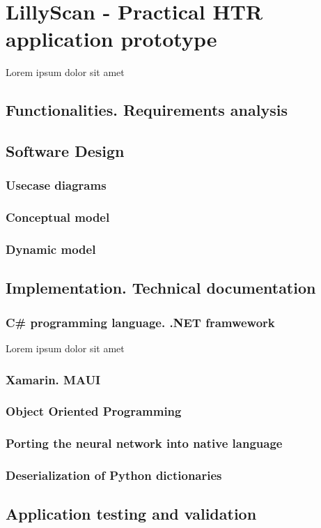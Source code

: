 \chapter{LillyScan - Practical HTR application prototype}
\label{chap:ch4}

\par Lorem ipsum dolor sit amet

\section{Functionalities. Requirements analysis}

\section{Software Design}

\subsection{Usecase diagrams}
\subsection{Conceptual model}
\subsection{Dynamic model}

\section{Implementation. Technical documentation}


\subsection{C\# programming language. .NET framwework}
\label{sec:ch3sec1}

\par Lorem ipsum dolor sit amet


\subsection{Xamarin. MAUI}
\label{subsec:ch3sec2}

\subsection{Object Oriented Programming}
\label{subsec:ch3sec2}

\subsection{Porting the neural network into native language}
\label{subsec:ch3sec2}

\subsection{Deserialization of Python dictionaries}
\label{subsec:ch3sec2}

\section{Application testing and validation}